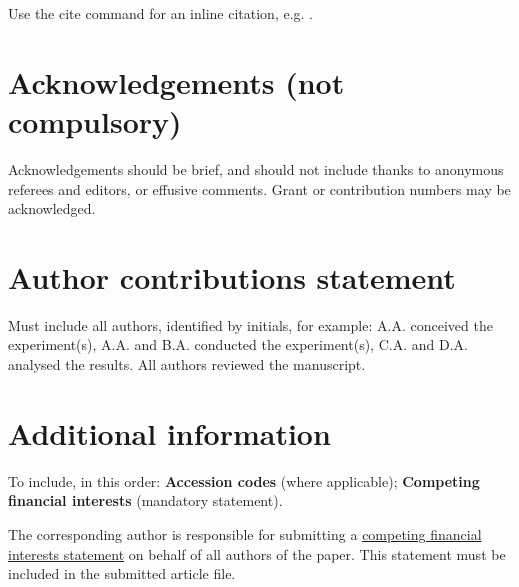 \documentclass[fleqn,10pt]{wlscirep}
\begin{document}
\noindent Use the cite command for an inline citation, e.g. \cite{behnel2011cython}.

\section*{Acknowledgements (not compulsory)}

Acknowledgements should be brief, and should not include thanks to anonymous referees and editors, or effusive comments. Grant or contribution numbers may be acknowledged.

\section*{Author contributions statement}

Must include all authors, identified by initials, for example:
A.A. conceived the experiment(s),  A.A. and B.A. conducted the experiment(s), C.A. and D.A. analysed the results.  All authors reviewed the manuscript.

\section*{Additional information}

To include, in this order: \textbf{Accession codes} (where applicable); \textbf{Competing financial interests} (mandatory statement).

The corresponding author is responsible for submitting a \href{http://www.nature.com/srep/policies/index.html#competing}{competing financial interests statement} on behalf of all authors of the paper. This statement must be included in the submitted article file.
\end{document}
